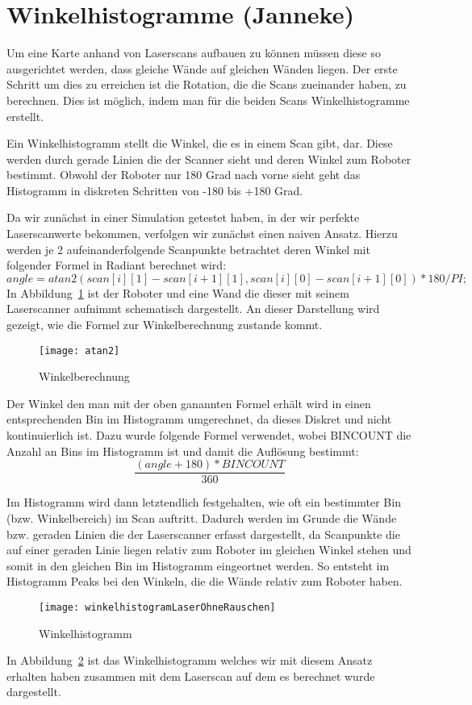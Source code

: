 \section{Winkelhistogramme (Janneke)}

Um eine Karte anhand von Laserscans aufbauen zu können müssen diese so ausgerichtet werden, dass gleiche Wände auf gleichen Wänden liegen. Der erste Schritt um dies zu erreichen ist die Rotation, die die Scans zueinander haben, zu berechnen. Dies ist möglich, indem man für die beiden Scans Winkelhistogramme erstellt.

Ein Winkelhistogramm stellt die Winkel, die es in einem Scan gibt, dar. Diese werden durch gerade Linien die der Scanner sieht und deren Winkel zum Roboter bestimmt. Obwohl der Roboter nur 180 Grad nach vorne sieht geht das Histogramm in diskreten Schritten von -180 bis +180 Grad.

Da wir zunächst in einer Simulation getestet haben, in der wir perfekte Laserscanwerte bekommen, verfolgen wir zunächst einen naiven Ansatz. Hierzu werden je 2 aufeinanderfolgende Scanpunkte betrachtet deren Winkel mit folgender Formel in Radiant berechnet wird: $$angle = atan2(scan[i][1] - scan[i+1][1], scan[i][0] - scan[i+1][0]) * 180 /PI;$$ In Abbildung~\ref{fig:Winkelberechnung} ist der Roboter und eine Wand die dieser mit seinem Laserscanner aufnimmt schematisch dargestellt. An dieser Darstellung wird gezeigt, wie die Formel zur Winkelberechnung zustande kommt.

\begin{figure}
	\centering
	\texttt{[image: atan2]}
	\caption{Winkelberechnung}
	\label{fig:Winkelberechnung}
\end{figure}

Der Winkel den man mit der oben ganannten Formel erhält wird in einen entsprechenden Bin im Histogramm umgerechnet, da dieses Diskret und nicht kontinuierlich ist. Dazu wurde folgende Formel verwendet, wobei BINCOUNT die Anzahl an Bins im Histogramm ist und damit die Auflösung bestimmt: $$\frac{(angle + 180) * BINCOUNT}{360}$$

Im Histogramm wird dann letztendlich festgehalten, wie oft ein bestimmter Bin (bzw. Winkelbereich) im Scan auftritt. Dadurch werden im Grunde die Wände bzw. geraden Linien die der Laserscanner erfasst dargestellt, da Scanpunkte die auf einer geraden Linie liegen relativ zum Roboter im gleichen Winkel stehen und somit in den gleichen Bin im Histogramm eingeortnet werden. So entsteht im Histogramm Peaks bei den Winkeln, die die Wände relativ zum Roboter haben.

\begin{figure}
	\centering
	\texttt{[image: winkelhistogramLaserOhneRauschen]}
	\caption{Winkelhistogramm}
	\label{fig:Winkelhistogramm}
\end{figure}

In Abbildung~\ref{fig:Winkelhistogramm} ist das Winkelhistogramm welches wir mit diesem Ansatz erhalten haben zusammen mit dem Laserscan auf dem es berechnet wurde dargestellt.